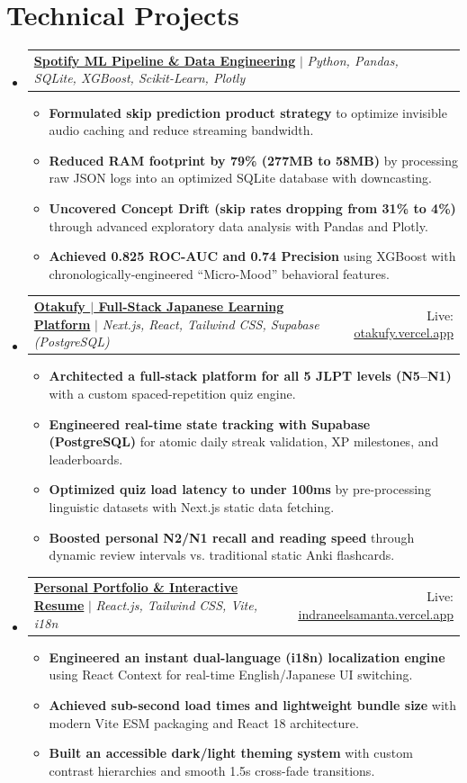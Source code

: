 \documentclass[letterpaper,10pt]{article}
\makeatletter
\newcommand{\resumeItem}[1]{
  \item\small{#1}
}
\newcommand{\resumeProjectHeading}[2]{
    \item
    \begin{tabular*}{0.98\textwidth}[t]{l@{\extracolsep{\fill}}r}
      \small#1 & \small#2 \\
    \end{tabular*}\vspace{-2pt}
}
\newcommand{\resumeSubHeadingListStart}{\begin{itemize}[leftmargin=0.12in, label={}, itemsep=3pt, parsep=0pt, topsep=2pt]}
\newcommand{\resumeSubHeadingListEnd}{\end{itemize}}
\newcommand{\resumeItemListStart}{\begin{itemize}[leftmargin=0.18in, itemsep=1.5pt, parsep=0pt, topsep=1.5pt, partopsep=0pt]}
\newcommand{\resumeItemListEnd}{\end{itemize}\vspace{-2pt}}
\makeatother
\begin{document}
\section{Technical Projects}
    \resumeSubHeadingListStart
      \resumeProjectHeading
          {\href{https://github.com/NotCatfish/Spotify-Analytics-Pipeline}{\textbf{Spotify ML Pipeline \& Data Engineering}} $|$ \emph{Python, Pandas, SQLite, XGBoost, Scikit-Learn, Plotly}}{}
          \resumeItemListStart
            \resumeItem{\textbf{Formulated skip prediction product strategy} to optimize invisible audio caching and reduce streaming bandwidth.}
            \resumeItem{\textbf{Reduced RAM footprint by 79\% (277MB to 58MB)} by processing raw JSON logs into an optimized SQLite database with downcasting.}
            \resumeItem{\textbf{Uncovered Concept Drift (skip rates dropping from 31\% to 4\%)} through advanced exploratory data analysis with Pandas and Plotly.}
            \resumeItem{\textbf{Achieved 0.825 ROC-AUC and 0.74 Precision} using XGBoost with chronologically-engineered ``Micro-Mood'' behavioral features.}
          \resumeItemListEnd

      \resumeProjectHeading
          {\href{https://github.com/NotCatfish/Otakufy}{\textbf{Otakufy $|$ Full-Stack Japanese Learning Platform}} $|$ \emph{Next.js, React, Tailwind CSS, Supabase (PostgreSQL)}}{Live: \href{https://otakufy.vercel.app/}{\underline{otakufy.vercel.app}}}
          \resumeItemListStart
            \resumeItem{\textbf{Architected a full-stack platform for all 5 JLPT levels (N5--N1)} with a custom spaced-repetition quiz engine.}
            \resumeItem{\textbf{Engineered real-time state tracking with Supabase (PostgreSQL)} for atomic daily streak validation, XP milestones, and leaderboards.}
            \resumeItem{\textbf{Optimized quiz load latency to under 100ms} by pre-processing linguistic datasets with Next.js static data fetching.}
            \resumeItem{\textbf{Boosted personal N2/N1 recall and reading speed} through dynamic review intervals vs. traditional static Anki flashcards.}
          \resumeItemListEnd

      \resumeProjectHeading
          {\href{https://github.com/NotCatfish/portfolio}{\textbf{Personal Portfolio \& Interactive Resume}} $|$ \emph{React.js, Tailwind CSS, Vite, i18n}}{Live: \href{https://indraneelsamanta.vercel.app/}{\underline{indraneelsamanta.vercel.app}}}
          \resumeItemListStart
            \resumeItem{\textbf{Engineered an instant dual-language (i18n) localization engine} using React Context for real-time English/Japanese UI switching.}
            \resumeItem{\textbf{Achieved sub-second load times and lightweight bundle size} with modern Vite ESM packaging and React 18 architecture.}
            \resumeItem{\textbf{Built an accessible dark/light theming system} with custom contrast hierarchies and smooth 1.5s cross-fade transitions.}
          \resumeItemListEnd
    \resumeSubHeadingListEnd
\end{document}
